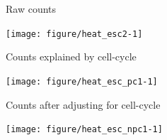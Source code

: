 \documentclass{beamer}\usepackage[]{graphicx}\usepackage[]{color}
\newenvironment{knitrout}{}{} %
\begin{document}
\begin{frame}[fragile]{Raw counts}
\begin{knitrout}\tiny
{}\color{fgcolor}

{\centering \texttt{[image: figure/heat\_esc2-1]} 

}



\end{knitrout}
\end{frame}

\begin{frame}[fragile]{Counts explained by cell-cycle}
\begin{knitrout}\tiny
{}\color{fgcolor}

{\centering \texttt{[image: figure/heat\_esc\_pc1-1]} 

}



\end{knitrout}
\end{frame}

\begin{frame}[fragile]{Counts after adjusting for cell-cycle}
\begin{knitrout}\tiny
{}\color{fgcolor}

{\centering \texttt{[image: figure/heat\_esc\_npc1-1]} 

}



\end{knitrout}
\end{frame}



\end{document}
